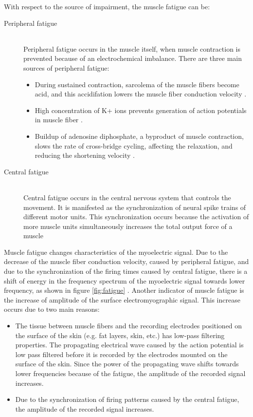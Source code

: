 With respect to the source of impairment, the muscle fatigue can be:

\begin{description}

\item[Peripheral fatigue] \hfill \\
	Peripheral fatigue occurs in the muscle itself, when muscle contraction is prevented because of an electrochemical imbalance. There are three main sources of peripheral fatigue:
	\begin{itemize}
		\item During sustained contraction, sarcolema of the muscle fibers become acid, and this accidifation lowers the muscle fiber conduction velocity \citep{DeLuca1984}.
		
		\item High concentration of K+ ions prevents generation of action potentials in muscle fiber \citep{Widmaier2014}. 
		
		\item Buildup of adenosine diphosphate, a byproduct of muscle contraction, slows the rate of cross-bridge cycling, affecting the relaxation, and reducing the shortening velocity \citep{Widmaier2014}.
	\end{itemize}

\item[Central fatigue] \hfill \\
	Central fatigue occurs in the central nervous system that controls the movement. It is manifested as the synchronization of neural spike trains of different motor units. This synchronization occurs because the activation of more muscle units simultaneously increases the total output force of a muscle

\end{description}

Muscle fatigue changes characteristics of the myoelectric signal. Due to the decrease of the muscle fiber conduction velocity, caused by peripheral fatigue, and due to the synchronization of the firing times caused by central fatigue, there is a shift of energy in the frequency spectrum of the myoelectric signal towards lower frequency, as shown in figure \ref{fig:fatigue} \citep{DeLuca1984}. Another indicator of muscle fatigue is the increase of amplitude of the surface electromyographic signal. This increase occurs due to two main reasons:
\begin{itemize}
\item The tissue between muscle fibers and the recording electrodes positioned on the surface of the skin (e.g. fat layers, skin, etc.) has low-pass filtering properties. The propagating electrical wave caused by the action potential is low pass filtered before it is recorded by the electrodes mounted on the surface of the skin. Since the power of the propagating wave shifts towards lower frequencies because of the fatigue, the amplitude of the recorded signal increases.

\item Due to the synchronization of firing patterns caused by the central fatigue, the amplitude of the recorded signal increases. 
\end{itemize} 

